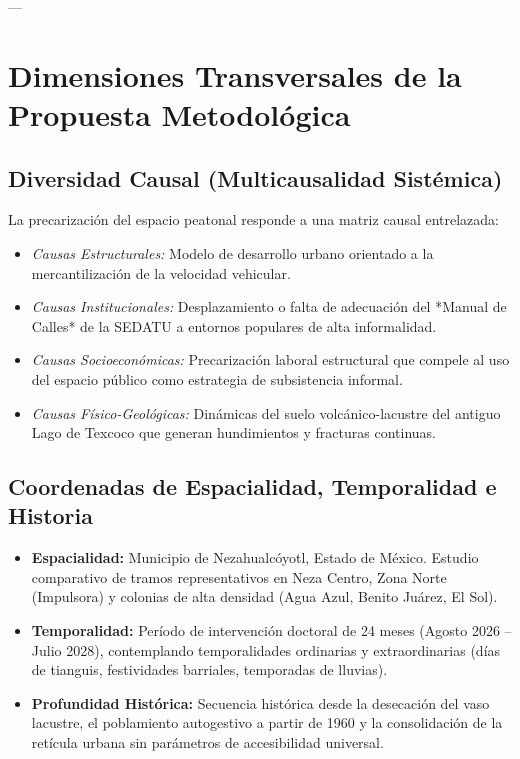 \documentclass[12pt,a4paper]{article}
\begin{document}
---

\section{Dimensiones Transversales de la Propuesta Metodológica}

\subsection{Diversidad Causal (Multicausalidad Sistémica)}
La precarización del espacio peatonal responde a una matriz causal entrelazada:
\begin{itemize}
    \item \textit{Causas Estructurales:} Modelo de desarrollo urbano orientado a la mercantilización de la velocidad vehicular.
    \item \textit{Causas Institucionales:} Desplazamiento o falta de adecuación del *Manual de Calles* de la SEDATU a entornos populares de alta informalidad.
    \item \textit{Causas Socioeconómicas:} Precarización laboral estructural que compele al uso del espacio público como estrategia de subsistencia informal.
    \item \textit{Causas Físico-Geológicas:} Dinámicas del suelo volcánico-lacustre del antiguo Lago de Texcoco que generan hundimientos y fracturas continuas.
\end{itemize}

\subsection{Coordenadas de Espacialidad, Temporalidad e Historia}
\begin{itemize}
    \item \textbf{Espacialidad:} Municipio de Nezahualcóyotl, Estado de México. Estudio comparativo de tramos representativos en Neza Centro, Zona Norte (Impulsora) y colonias de alta densidad (Agua Azul, Benito Juárez, El Sol).
    \item \textbf{Temporalidad:} Período de intervención doctoral de 24 meses (Agosto 2026 -- Julio 2028), contemplando temporalidades ordinarias y extraordinarias (días de tianguis, festividades barriales, temporadas de lluvias).
    \item \textbf{Profundidad Histórica:} Secuencia histórica desde la desecación del vaso lacustre, el poblamiento autogestivo a partir de 1960 y la consolidación de la retícula urbana sin parámetros de accesibilidad universal.
\end{itemize}
\end{document}
